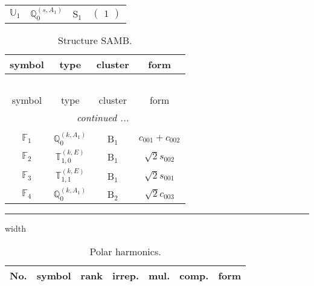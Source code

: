 \documentclass[fleqn,10pt,landscape]{article}
\begin{document}
\begin{itemize}
\begin{center}
\begin{longtable}{c|c|c|c}
$ \mathbb{U}_{1} $ & $\mathbb{Q}_{0}^{(s,A_{1})}$ & S$_{1}$ & $\begin{pmatrix} 1 \end{pmatrix}$ \\
\end{longtable}
\end{center}
\begin{center}
\renewcommand{\arraystretch}{1.3}
\begin{longtable}{c|c|c|c}
\caption{Structure SAMB.}
 \\
 \hline \hline
symbol & type & cluster & form \\ \hline \endfirsthead

\multicolumn{3}{l}{\tablename\ \thetable{}} \\
 \hline \hline
symbol & type & cluster & form \\ \hline \endhead

 \hline \hline
\multicolumn{3}{r}{\footnotesize\it continued ...} \\ \endfoot

 \hline \hline
\multicolumn{3}{r}{} \\ \endlastfoot

$ \mathbb{F}_{1} $ & $\mathbb{Q}_{0}^{(k,A_{1})}$ & B$_{1}$ & $c_{001} + c_{002}$ \\
$ \mathbb{F}_{2} $ & $\mathbb{T}_{1,0}^{(k,E)}$ & B$_{1}$ & $\sqrt{2} s_{002}$ \\
$ \mathbb{F}_{3} $ & $\mathbb{T}_{1,1}^{(k,E)}$ & B$_{1}$ & $\sqrt{2} s_{001}$ \\ \hline
$ \mathbb{F}_{4} $ & $\mathbb{Q}_{0}^{(k,A_{1})}$ & B$_{2}$ & $\sqrt{2} c_{003}$ \\
\end{longtable}
\end{center}

 \hfil \hrule height 1mm width \textwidth \hfil

\begin{center}
\renewcommand{\arraystretch}{1.3}
\begin{longtable}{ccccccc}
\caption{Polar harmonics.}
 \\
 \hline \hline
No. & symbol & rank & irrep. & mul. & comp. & form \\ \hline \endfirsthead


\end{longtable}
\end{center}
\end{itemize}
\end{document}
